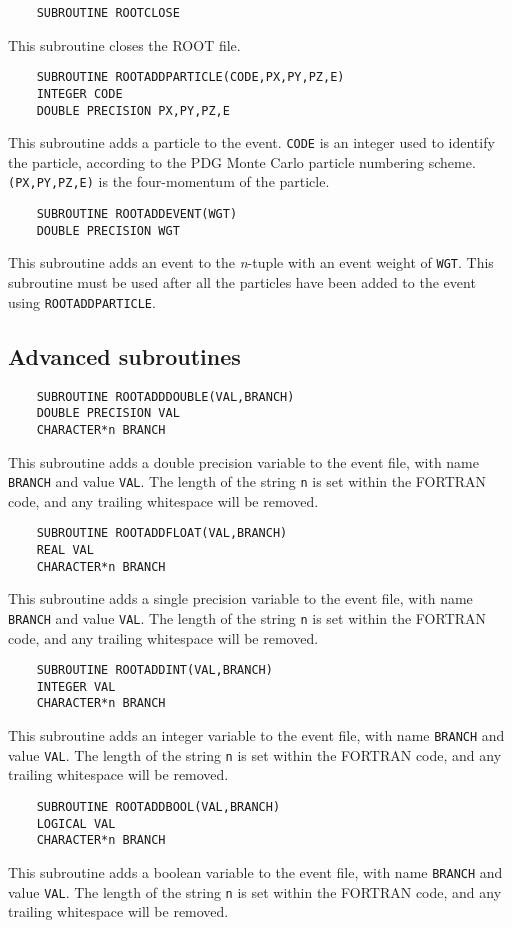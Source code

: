 \documentclass[a4paper,12pt]{article}
\begin{document}
\begin{verbatim}
    SUBROUTINE ROOTCLOSE\end{verbatim}
This subroutine closes the ROOT file.

\begin{verbatim}
    SUBROUTINE ROOTADDPARTICLE(CODE,PX,PY,PZ,E)
    INTEGER CODE
    DOUBLE PRECISION PX,PY,PZ,E\end{verbatim}
This subroutine adds a particle to the event. \verb|CODE| is an integer used to identify the particle, according to the PDG Monte Carlo particle numbering scheme. \verb|(PX,PY,PZ,E)| is the four-momentum of the particle.

\begin{verbatim}
    SUBROUTINE ROOTADDEVENT(WGT)
    DOUBLE PRECISION WGT\end{verbatim}
This subroutine adds an event to the \emph{n}-tuple with an event weight of \verb|WGT|. This subroutine must be used after all the particles have been added to the event using \verb|ROOTADDPARTICLE|.

\subsection{Advanced subroutines}
\begin{verbatim}
    SUBROUTINE ROOTADDDOUBLE(VAL,BRANCH)
    DOUBLE PRECISION VAL
    CHARACTER*n BRANCH\end{verbatim}
This subroutine adds a double precision variable to the event file, with name \verb|BRANCH| and value \verb|VAL|. The length of the string \verb|n| is set within the FORTRAN code, and any trailing whitespace will be removed.

\begin{verbatim}
    SUBROUTINE ROOTADDFLOAT(VAL,BRANCH)
    REAL VAL
    CHARACTER*n BRANCH\end{verbatim}
This subroutine adds a single precision variable to the event file, with name \verb|BRANCH| and value \verb|VAL|. The length of the string \verb|n| is set within the FORTRAN code, and any trailing whitespace will be removed.

\begin{verbatim}
    SUBROUTINE ROOTADDINT(VAL,BRANCH)
    INTEGER VAL
    CHARACTER*n BRANCH\end{verbatim}
This subroutine adds an integer variable to the event file, with name \verb|BRANCH| and value \verb|VAL|. The length of the string \verb|n| is set within the FORTRAN code, and any trailing whitespace will be removed.

\begin{verbatim}
    SUBROUTINE ROOTADDBOOL(VAL,BRANCH)
    LOGICAL VAL
    CHARACTER*n BRANCH\end{verbatim}
This subroutine adds a boolean variable to the event file, with name \verb|BRANCH| and value \verb|VAL|. The length of the string \verb|n| is set within the FORTRAN code, and any trailing whitespace will be removed.
\end{document}
